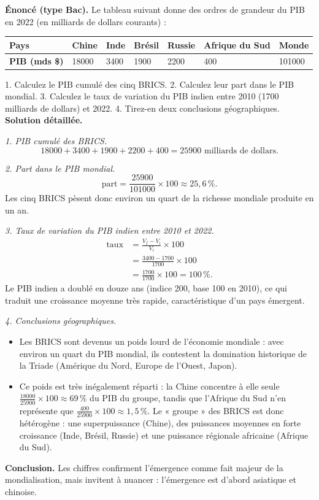 \documentclass[11pt]{article}
\begin{document}
\begin{exoresolu}
\textbf{Énoncé (type Bac).} Le tableau suivant donne des ordres de grandeur du PIB en 2022 (en milliards de dollars courants) :

\begin{center}
\begin{tabularx}{\linewidth}{|l|X|X|X|X|X|X|}\hline
\rowcolor{popblueL} \textbf{Pays} & Chine & Inde & Brésil & Russie & Afrique du Sud & Monde \\ \hline
\textbf{PIB (mds \$)} & \num{18000} & \num{3400} & \num{1900} & \num{2200} & 400 & \num{101000} \\ \hline
\end{tabularx}
\end{center}

1. Calculez le PIB cumulé des cinq BRICS. 2. Calculez leur part dans le PIB mondial. 3. Calculez le taux de variation du PIB indien entre 2010 (\num{1700} milliards de dollars) et 2022. 4. Tirez-en deux conclusions géographiques.
\tcblower
\textbf{Solution détaillée.}

\emph{1. PIB cumulé des BRICS.}
\[ \num{18000} + \num{3400} + \num{1900} + \num{2200} + 400 = \num{25900} \text{ milliards de dollars.} \]

\emph{2. Part dans le PIB mondial.}
\[ \text{part} = \frac{\num{25900}}{\num{101000}} \times 100 \approx 25,6\,\%. \]
Les cinq BRICS pèsent donc environ un quart de la richesse mondiale produite en un an.

\emph{3. Taux de variation du PIB indien entre 2010 et 2022.}
\begin{align*}
\text{taux} &= \frac{V_f - V_i}{V_i} \times 100 \\
&= \frac{\num{3400} - \num{1700}}{\num{1700}} \times 100 \\
&= \frac{\num{1700}}{\num{1700}} \times 100 = 100\,\%.
\end{align*}
Le PIB indien a doublé en douze ans (indice 200, base 100 en 2010), ce qui traduit une croissance moyenne très rapide, caractéristique d'un pays émergent.

\emph{4. Conclusions géographiques.}
\begin{itemize}
\item Les BRICS sont devenus un poids lourd de l'économie mondiale : avec environ un quart du PIB mondial, ils contestent la domination historique de la Triade (Amérique du Nord, Europe de l'Ouest, Japon).
\item Ce poids est très inégalement réparti : la Chine concentre à elle seule $\frac{\num{18000}}{\num{25900}} \times 100 \approx 69\,\%$ du PIB du groupe, tandis que l'Afrique du Sud n'en représente que $\frac{400}{\num{25900}} \times 100 \approx 1,5\,\%$. Le « groupe » des BRICS est donc hétérogène : une superpuissance (Chine), des puissances moyennes en forte croissance (Inde, Brésil, Russie) et une puissance régionale africaine (Afrique du Sud).
\end{itemize}
\textbf{Conclusion.} Les chiffres confirment l'émergence comme fait majeur de la mondialisation, mais invitent à nuancer : l'émergence est d'abord asiatique et chinoise.
\end{exoresolu}
\end{document}
